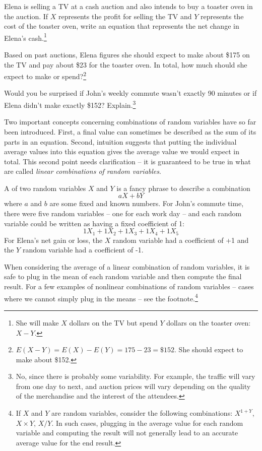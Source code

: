 \begin{exercise} \label{elenaIsSellingATVAndBuyingAToasterOvenAtAnAuction}
Elena is selling a TV at a cash auction and also intends to buy a toaster oven in the auction. If $X$ represents the profit for selling the TV and $Y$ represents the cost of the toaster oven, write an equation that represents the net change in Elena's cash.\footnote{She will make $X$ dollars on the TV but spend $Y$ dollars on the toaster oven: $X-Y$.}
\end{exercise}

\begin{exercise}
Based on past auctions, Elena figures she should expect to make about \$175 on the TV and pay about \$23 for the toaster oven. In total, how much should she expect to make or spend?\footnote{$E(X-Y) = E(X) - E(Y) = 175 - 23 = \$152$. She should expect to make about \$152.}
\end{exercise}

\begin{exercise} \label{explainWhyThereIsUncertaintyInTheSum}
Would you be surprised if John's weekly commute wasn't exactly 90 minutes or if Elena didn't make exactly \$152? Explain.\footnote{No, since there is probably some variability. For example, the traffic will vary from one day to next, and auction prices will vary depending on the quality of the merchandise and the interest of the attendees.}
\end{exercise}

Two important concepts concerning combinations of random variables have so far been introduced. First, a final value can sometimes be described as the sum of its parts in an equation. Second, intuition suggests that putting the individual average values into this equation gives the average value we would expect in total. This second point needs clarification -- it is guaranteed to be true in what are called \emph{linear combinations of random variables}.

A  of two random variables $X$ and $Y$ is a fancy phrase to describe a combination
$$ aX + bY$$
where $a$ and $b$ are some fixed and known numbers. For John's commute time, there were five random variables -- one for each work day -- and each random variable could be written as having a fixed coefficient of 1:
$$ 1X_1 + 1 X_2 + 1 X_3 + 1 X_4 + 1 X_5 $$
For Elena's net gain or loss, the $X$ random variable had a coefficient of +1 and the $Y$ random variable had a coefficient of -1.

When considering the average of a linear combination of random variables, it is safe to plug in the mean of each random variable and then compute the final result. For a few examples of nonlinear combinations of random variables -- cases where we cannot simply plug in the means -- see the footnote.\footnote{If $X$ and $Y$ are random variables, consider the following combinations: $X^{1+Y}$, $X\times Y$, $X/Y$. In such cases, plugging in the average value for each random variable and computing the result will not generally lead to an accurate average value for the end result.}

